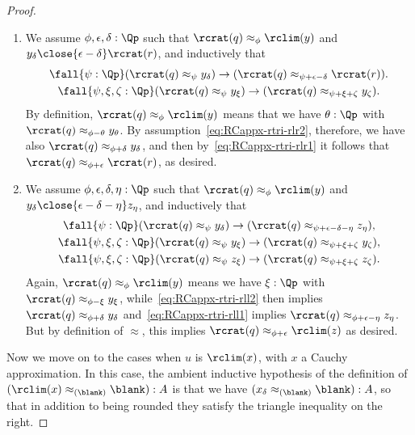 \begin{proof}
\begin{enumerate}
  \item We assume $\phi,\epsilon,\delta:\Qp$ such that $\rcrat(q)\approx_\phi \rclim(y)$ and $y_\delta \close{\epsilon-\delta} \rcrat(r)$, and inductively that
    \begin{gather}
      \fall{\psi:\Qp}(\rcrat(q) \approx_{\psi} y_\delta) \to (\rcrat(q) \approx_{\psi+\epsilon-\delta} \rcrat(r)).\label{eq:RCappx-rtri-rlr1}\\
      \fall{\psi,\xi,\zeta:\Qp} (\rcrat(q) \approx_{\psi} y_\xi) \to (\rcrat(q) \approx_{\psi+\xi+\zeta} y_\zeta).\label{eq:RCappx-rtri-rlr2}
    \end{gather}
    By definition, $\rcrat(q)\approx_\phi \rclim(y)$ means that we have $\theta:\Qp$ with $\rcrat(q) \approx_{\phi-\theta} y_\theta$.
    By assumption~\eqref{eq:RCappx-rtri-rlr2}, therefore, we have also $\rcrat(q) \approx_{\phi+\delta} y_\delta$, and then by~\eqref{eq:RCappx-rtri-rlr1} it follows that $\rcrat(q) \approx_{\phi+\epsilon} \rcrat(r)$, as desired.
  \item We assume $\phi,\epsilon,\delta,\eta:\Qp$ such that $\rcrat(q)\approx_\phi \rclim(y)$ and $y_\delta \close{\epsilon-\delta-\eta} z_\eta$, and inductively that
    \begin{gather}
      \fall{\psi:\Qp}(\rcrat(q) \approx_{\psi} y_\delta) \to (\rcrat(q) \approx_{\psi+\epsilon-\delta-\eta} z_\eta), \label{eq:RCappx-rtri-rll1}\\
      \fall{\psi,\xi,\zeta:\Qp} (\rcrat(q) \approx_{\psi} y_\xi) \to (\rcrat(q) \approx_{\psi+\xi+\zeta} y_\zeta), \label{eq:RCappx-rtri-rll2}\\
      \fall{\psi,\xi,\zeta:\Qp} (\rcrat(q) \approx_{\psi} z_\xi) \to (\rcrat(q) \approx_{\psi+\xi+\zeta} z_\zeta). \label{eq:RCappx-rtri-rll3}
    \end{gather}
    Again, $\rcrat(q)\approx_\phi \rclim(y)$ means we have $\xi:\Qp$ with $\rcrat(q) \approx_{\phi-\xi} y_\xi$, while~\eqref{eq:RCappx-rtri-rll2} then implies $\rcrat(q) \approx_{\phi+\delta} y_\delta$ and~\eqref{eq:RCappx-rtri-rll1} implies $\rcrat(q) \approx_{\phi+\epsilon-\eta} z_\eta$.
    But by definition of $\approx$, this implies $\rcrat(q) \approx_{\phi+\epsilon} \rclim(z)$ as desired.
  \end{enumerate}
  Now we move on to the cases when $u$ is $\rclim(x)$, with $x$ a Cauchy approximation.
  In this case, the ambient inductive hypothesis of the definition of $(\rclim(x) \approx_{(\blank)} {\blank}) : A$ is that we have ${(x_\delta \approx_{(\blank)} {\blank})}: A$, so that in addition to being rounded they satisfy the triangle inequality on the right.

\end{proof}
